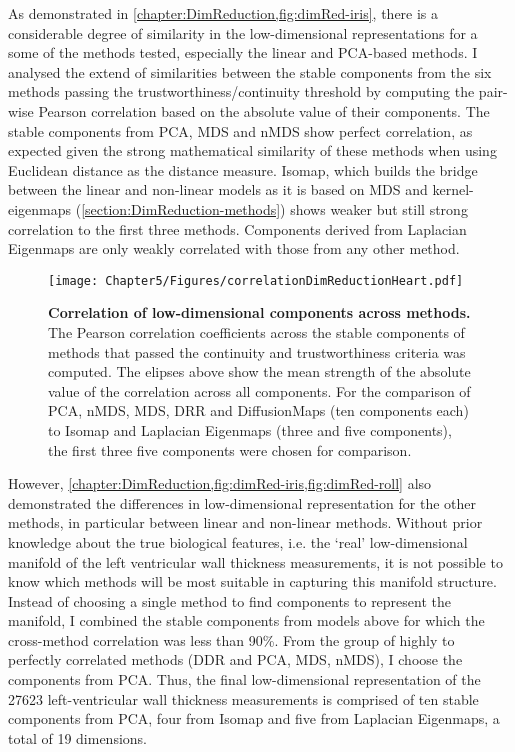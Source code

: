 As demonstrated in \cref{chapter:DimReduction,fig:dimRed-iris}, there is a considerable degree of similarity in the low-dimensional representations for a some of the methods tested, especially the linear and PCA-based methods. I analysed the extend of similarities between the stable components from the six methods passing the trustworthiness/continuity threshold by computing the pair-wise Pearson correlation based on the absolute value of their components.  The stable components from PCA, MDS and nMDS show perfect correlation, as expected given the strong mathematical similarity of these methods when using Euclidean distance as the distance measure. Isomap, which builds the bridge between the linear and non-linear models as it is based on MDS and kernel-eigenmaps (\cref{section:DimReduction-methods}) shows weaker but still strong correlation to the first three methods. Components derived from Laplacian Eigenmaps are only weakly correlated with those from any other method. 
\\
\begin{figure}[hbtp]
	\centering
	\texttt{[image: Chapter5/Figures/correlationDimReductionHeart.pdf]}
	\caption[\textbf{Correlation of low-dimensional components across methods. }]{\textbf{Correlation of low-dimensional components across methods. } The Pearson correlation coefficients across the stable components of methods that passed the continuity and trustworthiness criteria was computed. The elipses above show the mean strength of the absolute value of the correlation across all components. For the comparison of PCA, nMDS, MDS, DRR and DiffusionMaps (ten components each) to Isomap and Laplacian Eigenmaps (three and five components), the first three five components were chosen for comparison. }
	 	\label{fig:dimRed-correlation}
\end{figure}

However, \cref{chapter:DimReduction,fig:dimRed-iris,fig:dimRed-roll} also demonstrated the differences in low-dimensional representation for the other methods, in particular between linear and non-linear methods. Without prior knowledge about the true biological features, i.e. the `real' low-dimensional manifold of the left ventricular wall thickness measurements, it is not possible to know which methods will be most suitable in capturing this manifold structure. 
Instead of choosing a single method to find components to represent the manifold, I combined the stable components from models above for which the cross-method correlation was less than \num{90}\%. From the group of highly to perfectly correlated methods (DDR and PCA, MDS, nMDS), I choose the components from PCA. Thus, the final low-dimensional representation of the \num{27623} left-ventricular wall thickness measurements is comprised of ten stable components from PCA, four from Isomap and five from Laplacian Eigenmaps, a total of \num{19} dimensions.



 


